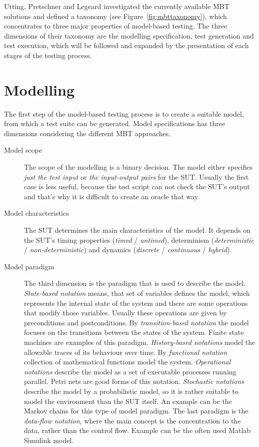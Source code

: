 Utting, Pretschner and Legeard investigated the currently available MBT solutions and defined a taxonomy (see Figure~\ref{fig:mbttaxonomy}), which concentrates to three major properties of model-based testing. The three dimensions of their taxonomy are the modelling specification, test generation and test execution, which will be followed and expanded by the presentation of each stages of the testing process.

\section{Modelling}
\label{sec:modelling}

The first step of the model-based testing process is to create a suitable model, from which a test suite can be generated.  Model specifications has three dimensions considering the different MBT approaches.

\begin{description}
	\item[Model scope] The scope of the modelling is a binary decision. The model either specifies \textit{just the test input} or \textit{the input-output pairs} for the SUT. Usually the first case is less useful, because the test script can not check the SUT's output and that's why it is difficult to create an oracle that way.
	
	\item[Model characteristics] The SUT determines the main characteristics of the model. It depends on the SUT's timing properties (\textit{timed} / \textit{untimed}), determinism (\textit{deterministic} / \textit{non-deterministic}) and dynamics (\textit{discrete} / \textit{continuous} / \textit{hybrid}).
	
	\item[Model paradigm] The third dimension is the paradigm that is used to describe the model. \textit{State-based notation} means, that set of variables defines the model, which represents the internal state of the system and there are some operations that modify those variables. Usually these operations are given by preconditions and postconditions. By \textit{transition-based notation} the model focuses on the transitions between the states of the system. Finite state machines are examples of this paradigm. \textit{History-based notations} model the allowable traces of its behaviour over time. By \textit{functional notation} collection of mathematical functions model the system. \textit{Operational notations} describe the model as a set of executable processes running parallel. Petri nets are good forms of this notation. \textit{Stochastic notations} describe the model by a probabilistic model, so it is rather suitable to model the environment than the SUT itself. An example can be the Markov chains for this type of model paradigm. The last paradigm is the \textit{data-flow notation}, where the main concept is the concentration to the data, rather than the control flow. Example can be the often used Matlab Simulink model.
\end{description}

